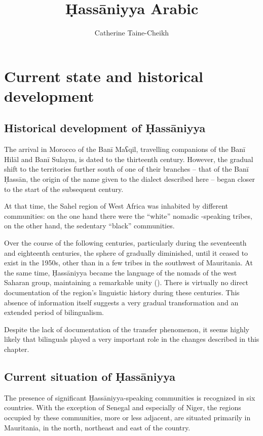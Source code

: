 \documentclass[output=paper]{langsci/langscibook}
\author{Catherine Taine-Cheikh\affiliation{CNRS, LACITO}}
\title{Ḥassāniyya Arabic}
\begin{document}
\maketitle 
 

\section{Current state and historical development}

\subsection{Historical development of Ḥassāniyya} %

The arrival in Morocco of the Banī Maʕqil, travelling companions of the Banī Hilāl and Banī Sulaym, is dated to the thirteenth century. However, the gradual shift to the territories further south of one of their branches – that of the Banī Ḥassān, the origin of the name given to the dialect described here – began closer to the start of the subsequent century. 

At that time, the Sahel region of West Africa was inhabited by different commu\-nities: on the one hand there were the “white” nomadic -speaking tribes, on the other hand, the sedentary “black” communities.

Over the course of the following centuries, particularly during the seventeenth and eighteenth centuries, the sphere of   gradually diminished, until it ceased to exist in the 1950s, other than in a few tribes in the southwest of Mauritania. At the same time, Ḥassāniyya  became the language of the nomads of the west Saharan group, maintaining a remarkable unity (\citealt{Taine-Cheikh2016,Taine-Cheikh2018historical}). There is virtually no direct documentation of the region’s linguistic history during these centuries. This absence of information itself suggests a very gradual transformation and an extended period of {bilingualism}.

Despite the lack of documentation of the {transfer} phenomenon, it seems highly likely that bilinguals played a very important role in the changes described in this chapter. 

\subsection{Current situation of Ḥassāniyya} %

The presence of significant Ḥassāniyya-speaking communities is recognized in six countries. With the exception of Senegal and especially of Niger, the regions occupied by these communities, more or less adjacent, are situated primarily in Mauritania, in the north, northeast and east of the country. 
\end{document}

